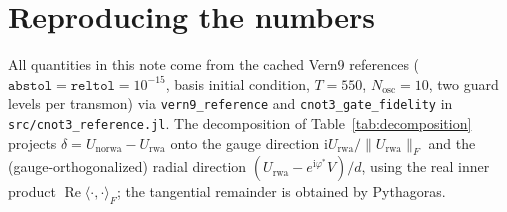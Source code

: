 \documentclass[11pt]{article}
\newcommand{\ii}{\mathrm{i}}
\renewcommand{\Re}{\operatorname{Re}}
\newcommand{\code}[1]{\texttt{#1}}
\newcommand{\norm}[1]{\lVert #1 \rVert}
\begin{document}
\section{Reproducing the numbers}

All quantities in this note come from the cached Vern9 references
($\code{abstol} = \code{reltol} = 10^{-15}$, basis initial condition,
$T = 550$, $N_{\mathrm{osc}} = 10$, two guard levels per transmon) via
\code{vern9\_reference} and \code{cnot3\_gate\_fidelity} in
\code{src/cnot3\_reference.jl}.  The decomposition of
Table~\ref{tab:decomposition} projects
$\delta = U_{\mathrm{norwa}} - U_{\mathrm{rwa}}$ onto the gauge direction
$\ii U_{\mathrm{rwa}}/\norm{U_{\mathrm{rwa}}}_F$ and the (gauge-orthogonalized)
radial direction $(U_{\mathrm{rwa}} - e^{\ii\varphi^*}V)/d$, using the real
inner product $\Re\langle\cdot,\cdot\rangle_F$; the tangential remainder is
obtained by Pythagoras.
\end{document}
